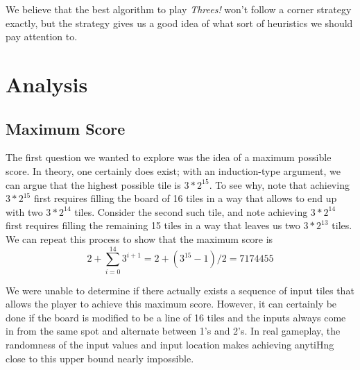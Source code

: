 \documentclass[11pt]{article}
\begin{document}
We believe that the best algorithm to play \emph{Threes!} won't follow a corner strategy exactly, but the strategy gives us a good idea of what sort of heuristics we should pay attention to.

\section{Analysis}

\subsection{Maximum Score}

The first question we wanted to explore was the idea of a maximum possible score. In theory, one certainly does exist; with an induction-type argument, we can argue that the highest possible tile is $3*2^{15}$. To see why, note that achieving $3*2^{15}$ first requires filling the board of 16 tiles in a way that allows to end up with two $3*2^{14}$ tiles. Consider the second such tile, and note achieving $3*2^{14}$ first requires filling the remaining 15 tiles in a way that leaves us two $3*2^{13}$ tiles. We can repeat this process to show that the maximum score is
\[ 2 + \sum_{i=0}^{14} 3^{i+1} = 2 + (3^{15}-1)/2 = 7174455 \]

We were unable to determine if there actually exists a sequence of input tiles that allows the player to achieve this maximum score. However, it can certainly be done if the board is modified to be a line of 16 tiles and the inputs always come in from the same spot and alternate between 1's and 2's. In real gameplay, the randomness of the input values and input location makes achieving anytiHng close to this upper bound nearly impossible.
\end{document}
